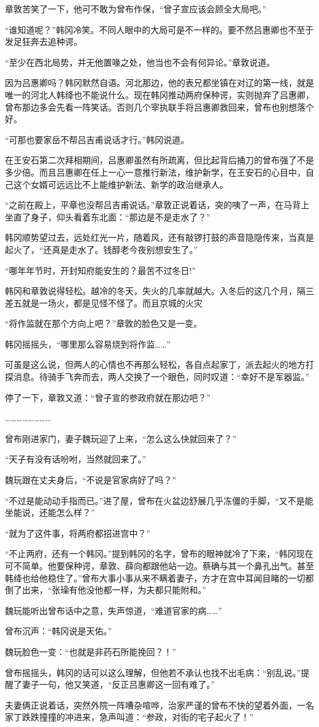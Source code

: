 章敦苦笑了一下，他可不敢为曾布作保，“曾子宣应该会顾全大局吧。”

“谁知道呢？”韩冈冷笑。不同人眼中的大局可是不一样的。要不然吕惠卿也不至于发足狂奔去追种谔。

“至少在西北局势，并无他置喙之处，他当也不会有何异论。”章敦说道。

因为吕惠卿吗？韩冈默然自语。河北那边，他的表兄都坐镇在对辽的第一线，就是唯一的河北人韩绛也不能说什么。现在韩冈推动两府保种谔，实则抛弃了吕惠卿，曾布那边多会先看一阵笑话。否则几个宰执联手将吕惠卿救回来，曾布也别想落个好。

“可那也要家岳不帮吕吉甫说话才行。”韩冈说道。

在王安石第二次拜相期间，吕惠卿虽然有所疏离，但比起背后捅刀的曾布强了不是多少倍。而且吕惠卿在任上一心一意推行新法，维护新学，在王安石的心目中，自己这个女婿可远远比不上能维护新法、新学的政治继承人。

“之前在殿上，平章也没帮吕吉甫说话。”章敦正说着话，突的咦了一声，在马背上坐直了身子，仰头看着东北面：“那边是不是走水了？”

韩冈顺势望过去，远处红光一片，随着风，还有敲锣打鼓的声音隐隐传来，当真是起火了，“还真是走水了。钱醇老今夜别想安生了。”

“哪年年节时，开封知府能安生的？最苦不过冬日!”

韩冈和章敦说得轻松。越冷的冬天，失火的几率就越大。入冬后的这几个月，隔三差五就是一场火，都是见怪不怪了。而且京城的火灾

“将作监就在那个方向上吧？”章敦的脸色又是一变。

韩冈摇摇头，“哪里那么容易烧到将作监……”

可虽是这么说，但两人的心情也不再那么轻松，各自点起家丁，派去起火的地方打探消息。待骑手飞奔而去，两人交换了一个眼色，同时叹道：“幸好不是军器监。”

停了一下，章敦又道：“曾子宣的参政府就在那边吧？”

……………………

曾布刚进家门，妻子魏玩迎了上来，“怎么这么快就回来了？”

“天子有没有话吩咐，当然就回来了。”

魏玩跟在丈夫身后，“不说是官家病好了吗？”

“不过是能动动手指而已。”进了屋，曾布在火盆边舒展几乎冻僵的手脚，“又不是能坐能说，还能怎么样？”

“就为了这件事，将两府都招进宫中？”

“不止两府，还有一个韩冈。”提到韩冈的名字，曾布的眼神就冷了下来，“韩冈现在可不简单。他要保种谔，章敦、薛向都跟他站一边。蔡确与其一个鼻孔出气。甚至韩绛也给他稳住了。”曾布大事小事从来不瞒着妻子，方才在宫中耳闻目睹的一切都倒了出来，“张璪有他没他都一样，为夫都只能附和。”

魏玩能听出曾布话中之意，失声惊道，“难道官家的病……”

曾布沉声：“韩冈说是天佑。”

魏玩脸色一变：“也就是非药石所能挽回？！”

曾布摇摇头，韩冈的话可以这么理解，但他若不承认也找不出毛病：“别乱说。”提醒了妻子一句，他又笑道，“反正吕惠卿这一回有难了。”

夫妻俩正说着话，突然外院一阵嘈杂喧哗，治家严谨的曾布不快的望着外面，一名家丁跌跌撞撞的冲进来，急声叫道：“参政，对街的宅子起火了！”


